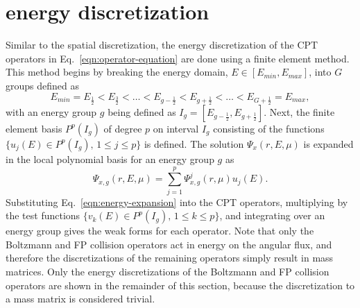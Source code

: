 \documentclass[../main.tex]{subfiles}
\begin{document}
\section{\dG energy discretization}
Similar to the spatial discretization, the energy discretization of the CPT operators in Eq.~\eqref{eqn:operator-equation} are done using a \dG finite element method. This method begins by breaking the energy domain, $E \in [E_{min}, E_{max}]$, into $G$ groups defined as
\begin{equation}
    E_{min} = E_{\frac{1}{2}} < E_{\frac{3}{2}} < \ldots < E_{g-\frac{1}{2}} < E_{g+\frac{1}{2}} < \ldots < E_{G+\frac{1}{2}} = E_{max},
\end{equation}
with an energy group $g$ being defined as $I_g = [E_{g-\frac{1}{2}}, E_{g+\frac{1}{2}}]$. Next, the finite element basis $P^p(I_g)$ of degree $p$ on interval $I_g$ consisting of the functions $\lbrace u_j(E) \in P^p(I_g), \, 1 \leq j \leq p \rbrace$ is defined. The solution $\Psi_x(r,E,\mu)$ is expanded in the local polynomial basis for an energy group $g$ as
\begin{equation} \label{eqn:energy-expansion}
    \Psi_{x,g}(r,E,\mu) = \sum_{j=1}^p \Psi_{x,g}^j(r,\mu) u_j(E).
\end{equation}
Substituting Eq.~\eqref{eqn:energy-expansion} into the CPT operators, multiplying by the test functions $\lbrace v_k(E) \in P^p(I_g), \, 1 \leq k \leq p \rbrace$, and integrating over an energy group gives the weak forms for each operator. Note that only the Boltzmann and FP collision operators act in energy on the angular flux, and therefore the \dG discretizations of the remaining operators simply result in mass matrices. Only the \dG energy discretizations of the Boltzmann and FP collision operators are shown in the remainder of this section, because the discretization to a mass matrix is considered trivial.
\end{document}
